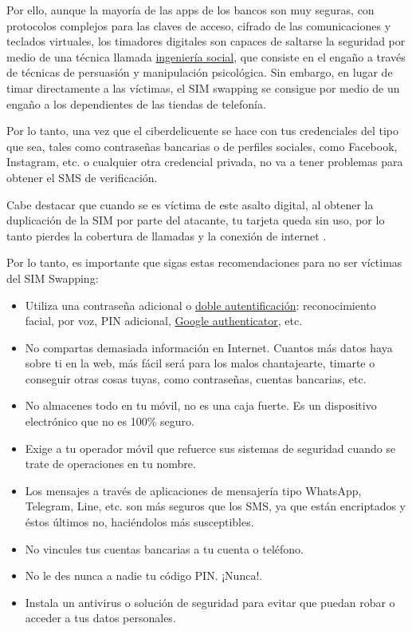 \documentclass[
  spanish,
  a4paper,
  openany]{book}
\begin{document}
Por ello, aunque la mayoría de las apps de los bancos son muy seguras, con protocolos complejos para las claves de acceso, cifrado de las comunicaciones y teclados virtuales, los timadores digitales son capaces de saltarse la seguridad por medio de una técnica llamada \href{https://es.wikipedia.org/wiki/Ingeniería_social_(seguridad_informática)}{ingeniería social}, que consiste en el engaño a través de técnicas de persuasión y manipulación psicológica. Sin embargo, en lugar de timar directamente a las víctimas, el SIM swapping se consigue por medio de un engaño a los dependientes de las tiendas de telefonía.

Por lo tanto, una vez que el ciberdelicuente se hace con tus credenciales del tipo que sea, tales como contraseñas bancarias o de perfiles sociales, como Facebook, Instagram, etc. o cualquier otra credencial privada, no va a tener problemas para obtener el SMS de verificación.

Cabe destacar que cuando se es víctima de este asalto digital, al obtener la duplicación de la SIM por parte del atacante, tu tarjeta queda sin uso, por lo tanto pierdes la cobertura de llamadas y la conexión de internet \citep{PANDA-sim}.

Por lo tanto, es importante que sigas estas recomendaciones para no ser víctimas del SIM Swapping:

\begin{itemize}
\item
  Utiliza una contraseña adicional o \href{https://www.incibe.es/ciudadania/blog/el-factor-de-autenticacion-doble-y-multiple}{doble autentificación}: reconocimiento facial, por voz, PIN adicional, \href{https://play.google.com/store/apps/details?id=com.google.android.apps.authenticator2&hl=es&gl=US}{Google authenticator}, etc.
\item
  No compartas demasiada información en Internet. Cuantos más datos haya sobre ti en la web, más fácil será para los malos chantajearte, timarte o conseguir otras cosas tuyas, como contraseñas, cuentas bancarias, etc.
\item
  No almacenes todo en tu móvil, no es una caja fuerte. Es un dispositivo electrónico que no es 100\% seguro.
\item
  Exige a tu operador móvil que refuerce sus sistemas de seguridad cuando se trate de operaciones en tu nombre.
\item
  Los mensajes a través de aplicaciones de mensajería tipo WhatsApp, Telegram, Line, etc. son más seguros que los SMS, ya que están encriptados y éstos últimos no, haciéndolos más susceptibles.
\item
  No vincules tus cuentas bancarias a tu cuenta o teléfono.
\item
  No le des nunca a nadie tu código PIN. ¡Nunca!.
\item
  Instala un antivirus o solución de seguridad para evitar que puedan robar o acceder a tus datos personales.
\end{itemize}
\end{document}

